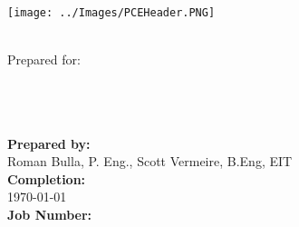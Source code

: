 \begin{titlepage}
\thispagestyle{empty}
\center %

\begin{center}
\texttt{[image: ../Images/PCEHeader.PNG]}
\end{center}

\begin{center}
\vspace{20mm}
\Huge \DocTitle \\ %
\vspace{25mm}
\large Prepared for: \\
\LARGE\textbf{\Customer} \\
\large\textbf{\Target}\\
\small\textbf{\Address}\\
\end{center}



 
\begin{flushleft} \large
\vfill

\textbf{Prepared by:} \\
Roman Bulla, P. Eng., Scott Vermeire, B.Eng, EIT \\
\vspace{12pt} 
\textbf{Completion:}\\
\today \\ 
\vspace{12pt} 
\textbf{Job Number:}\\
\JobNum \\
\end{flushleft}

\end{titlepage}
